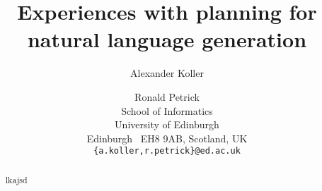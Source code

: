 \documentclass[letterpaper]{article}
\title{Experiences with planning for natural language generation}
\author{Alexander Koller \and Ronald Petrick \\
School of Informatics \\
University of Edinburgh \\
Edinburgh \ EH8 9AB, Scotland, UK \\
\texttt{\{a.koller,r.petrick\}@ed.ac.uk}}
\begin{document}
\maketitle

\begin{abstract}
  lkajsd
\end{abstract}












\end{document}
